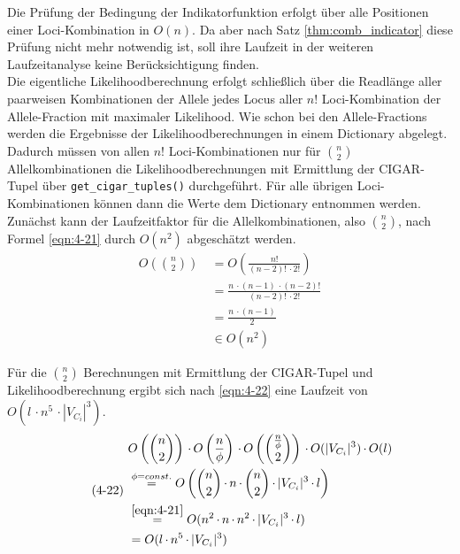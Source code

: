 Die Prüfung der Bedingung der Indikatorfunktion erfolgt über alle Positionen einer Loci-Kombination in $O(n)$. Da aber nach Satz \ref{thm:comb_indicator} diese Prüfung nicht mehr notwendig ist, soll ihre Laufzeit in der weiteren Laufzeitanalyse keine Berücksichtigung finden. \\

Die eigentliche Likelihoodberechnung erfolgt schließlich über die Readlänge aller paarweisen Kombinationen der Allele jedes Locus aller $n!$ Loci-Kombination der Allele-Fraction mit maximaler Likelihood. Wie schon bei den Allele-Fractions werden die Ergebnisse der Likelihoodberechnungen in einem Dictionary abgelegt. Dadurch müssen von allen $n!$ Loci-Kombinationen nur für $\binom{n}{2}$ Allelkombinationen die Likelihoodberechnungen mit Ermittlung der CIGAR-Tupel über \lstinline|get_cigar_tuples()| durchgeführt. Für alle übrigen Loci-Kombinationen können dann die Werte dem Dictionary entnommen werden. \\

Zunächst kann der Laufzeitfaktor für die Allelkombinationen, also $\binom{n}{2}$, nach Formel \eqref{eqn:4-21} durch $O(n^2)$ abgeschätzt werden.
\begin{equation} \label{eqn:4-21}
\tag{4-21}
\begin{aligned}
 O\left( \binom{n}{2}\right) &\ {} = O\left( \frac{n!}{(n - 2)!\, \cdotp 2! }\right) \\
&\ = \frac{n \, \cdotp (n - 1) \, \cdotp (n - 2)!}{(n - 2)!\, \cdotp 2!} \\
&\ = \frac{n \, \cdotp (n - 1)}{2} \\
&\ \in O(n^2)
\end{aligned}
\end{equation}

Für die $\binom{n}{2}$ Berechnungen mit Ermittlung der CIGAR-Tupel und Likelihoodberechnung ergibt sich nach \eqref{eqn:4-22} eine Laufzeit von $ O( l\, \cdotp n^5  \, \cdotp |V_{C_{i}}|^3) $.
\begin{equation} \label{eqn:4-22}
\tag{4-22}
\begin{aligned}
&\ {} O\left( \binom{n}{2}\right)  \, \cdotp O\left(\frac{n}{\phi} \right) \, \cdotp O\left( \binom{\frac{n}{\phi}}{2}\right)  \, \cdotp O(|V_{C_{i}}|^3) \, \cdotp O(l)  \\
&\ \stackrel{\phi = const.}{=} O\left( \binom{n}{2} \, \cdotp n \, \cdotp \binom{n}{2} \, \cdotp |V_{C_{i}}|^3 \, \cdotp l \right) \\
&\ \stackrel{\eqref{eqn:4-21}}{=} O( n^2 \, \cdotp n \, \cdotp n^2 \, \cdotp |V_{C_{i}}|^3 \, \cdotp l) \\
&\ = O( l\, \cdotp n^5  \, \cdotp |V_{C_{i}}|^3)\\
\end{aligned}
\end{equation}

